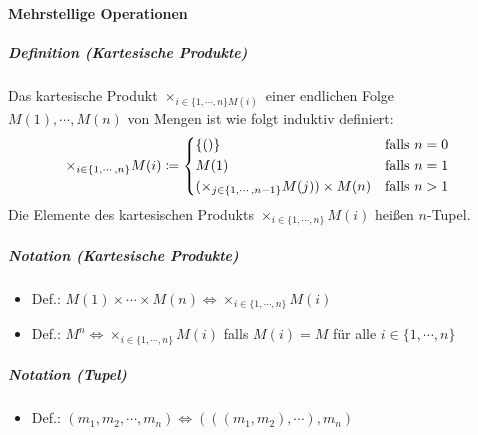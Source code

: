 \documentclass[a4paper, 11pt, accentcolor = tud3b]{tudreport}
\newcommand{\definition}[2]{\subparagraph{Definition (#1)} #2}
\newcommand{\notation}[2]{\subparagraph{Notation (#1)} #2}
\begin{document}
		    \paragraph{Mehrstellige Operationen}
			    \definition{Kartesische Produkte}{
				    Das kartesische Produkt $ \times _ { i \in \{ 1, \cdots, n \} M(i) } $ einer endlichen Folge $ M(1), \cdots, M(n) $ von Mengen ist wie folgt induktiv definiert:
				    \begin{equation*}
					    \times _ { i \in \{ 1, \cdots, n \} } M(i) \coloneqq \begin{cases*}
						    \{ () \} & \text{falls $ n = 0 $} \\
						    M(1) & \text{falls $ n = 1 $} \\
						    (\times _ { j \in \{ 1, \cdots, n - 1 \} } M(j)) \times M(n) & \text{falls $ n > 1 $} \\
					    \end{cases*}
				    \end{equation*}
				    Die Elemente des kartesischen Produkts $ \times _ { i \in \{ 1, \cdots, n \} } M(i) $ heißen $ n $-Tupel.
				}
			    
			    \notation{Kartesische Produkte}{
				    \begin{itemize}
				    	\item Def.: $ M(1) \times \cdots \times M(n) \iff \times _ { i \in \{ 1, \cdots, n \} } M(i) $
				    	\item Def.: $ M ^ n \iff \times _ { i \in \{ 1, \cdots, n \} } M(i) $ falls $ M(i) = M $ für alle $ i \in \{ 1, \cdots, n \} $
				    \end{itemize}
				}
		    
			    \notation{Tupel}{
				    \begin{itemize}
				    	\item Def.: $ (m _ 1, m _ 2, \cdots, m _ n) \iff (((m _ 1, m _ 2), \cdots), m _ n) $
				    \end{itemize}
				}
			    
\end{document}
